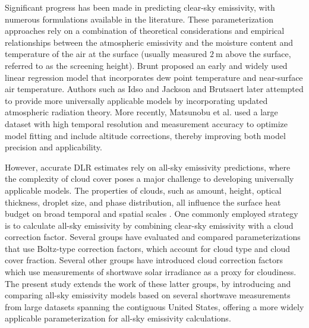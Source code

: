 \documentclass[preprint,12pt]{elsarticle}
\begin{document}
Significant progress has been made in predicting clear-sky emissivity, with numerous formulations available in the literature. These parameterization approaches rely on a combination of theoretical considerations and empirical relationships between the atmospheric emissivity and the moisture content and temperature of the air at the surface (usually measured $\SI{2}{\meter}$ above the surface, referred to as the screening height). Brunt \cite{brunt1932notes} proposed an early and widely used linear regression model that incorporates dew point temperature and near-surface air temperature. Authors such as Idso and Jackson \cite{idso1969thermal} and Brutsaert \cite{brutsaert1975derivable} later attempted to provide more universally applicable models by incorporating updated atmospheric radiation theory. More recently, Matsunobu et al. \cite{matsunobu2024effective} used a large dataset with high temporal resolution and measurement accuracy to optimize model fitting and include altitude corrections, thereby improving both model precision and applicability. 

However, accurate DLR estimates rely on all-sky emissivity predictions, where the complexity of cloud cover poses a major challenge to developing universally applicable models. The properties of clouds, such as amount, height, optical thickness, droplet size, and phase distribution, all influence the surface heat budget on broad temporal and spatial scales \citep{kiehl1997earth,li2017determination,kay2016recent}. %
One commonly employed strategy is to calculate all-sky emissivity by combining clear-sky emissivity with a cloud correction factor. Several groups \cite{arnfield1979evaluation,alados1995estimation,niemala2001comparison} have evaluated and compared parameterizations that use Boltz-type correction factors, which account for cloud type and cloud cover fraction. Several other groups \cite{alados2012estimation,crawford1999improved} have introduced cloud correction factors which use measurements of shortwave solar irradiance as a proxy for cloudiness. The present study extends the work of these latter groups, by introducing and comparing all-sky emissivity models based on several shortwave measurements from large datasets spanning the contiguous United States, offering a more widely applicable parameterization for all-sky emissivity calculations. 
\end{document}
